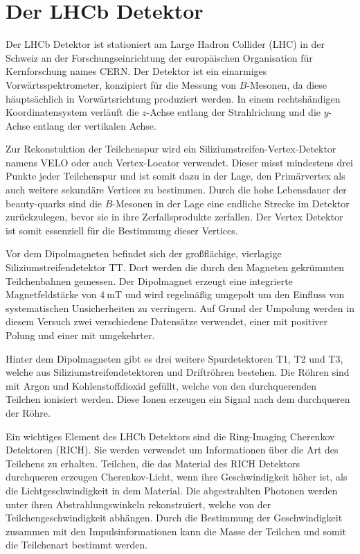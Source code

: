 \section{Der LHCb Detektor}
\label{sec:lhcb}

Der LHCb Detektor \cite{lhcb} ist stationiert am Large Hadron Collider (LHC) in
der Schweiz an der Forschungseinrichtung der europäischen
Organisation für Kernforschung names CERN. Der Detektor ist ein einarmiges
Vorwärtsspektrometer, konzipiert für die Messung von $B$-Mesonen, da diese
häuptsächlich in Vorwärtsrichtung produziert werden. In einem rechtshändigen
Koordinatensystem verläuft die $z$-Achse entlang der Strahlrichung und die
$y$-Achse entlang der vertikalen Achse. \par

Zur Rekonstuktion der Teilchenspur wird ein Siliziumstreifen-Vertex-Detektor
namens VELO oder auch Vertex-Locator verwendet. Dieser misst mindestens drei
Punkte jeder Teilchenspur und ist somit dazu in der Lage, den Primärvertex als
auch weitere sekundäre Vertices zu bestimmen. Durch die hohe Lebensdauer der beauty-quarks
sind die $B$-Mesonen in der Lage eine endliche Strecke im Detektor zurückzulegen,
bevor sie in ihre Zerfallsprodukte zerfallen. Der Vertex Detektor ist somit
essenziell für die Bestimmung dieser Vertices. \par
Vor dem Dipolmagneten befindet sich
der großflächige, vierlagige Siliziumstreifendetektor TT. Dort werden die durch den
Magneten gekrümmten Teilchenbahnen gemessen. Der Dipolmagnet erzeugt eine
integrierte Magnetfeldstärke von $\SI{4}{\milli\tesla}$ und wird regelmäßig
umgepolt um den Einfluss von systematischen Unsicherheiten zu verringern. Auf Grund
der Umpolung werden in diesem Versuch zwei verschiedene Datensätze verwendet, einer
mit positiver Polung und einer mit umgekehrter. \par
Hinter dem Dipolmagneten gibt es drei weitere Spurdetektoren T1, T2 und T3, welche
aus Siliziumstreifendetektoren und Driftröhren bestehen. Die Röhren sind mit
Argon und Kohlenstoffdioxid gefüllt, welche von den durchquerenden Teilchen
ionisiert werden. Diese Ionen erzeugen ein Signal nach dem durchqueren der Röhre. \par

Ein wichtiges Element des LHCb Detektors sind die Ring-Imaging Cherenkov Detektoren (RICH).
Sie werden verwendet um Informationen über die Art des Teilchens zu erhalten. Teilchen,
die das Material des RICH Detektors durchqueren erzeugen Cherenkov-Licht, wenn
ihre Geschwindigkeit höher ist, als die Lichtgeschwindigkeit in dem Material. Die
abgestrahlten Photonen werden unter ihren Abstrahlungswinkeln rekonstruiert, welche
von der Teilchengeschwindigkeit abhängen. Durch die Bestimmung der Geschwindigkeit
zusammen mit den Impulsinformationen kann die Masse der Teilchen und somit die
Teilchenart bestimmt werden.\par

